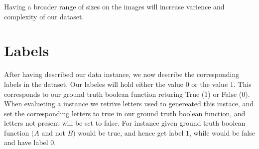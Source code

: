 Having a broader range of sizes on the images will increase varience and complexity of our dataset.

\section{Labels}
After having described our data instance, we now describe the corresponding labels in the dataset.
Our labeles will hold either the value $0$ or the value $1$. This corresponds to our ground truth boolean function returing 
True ($1$) or False ($0$). When evalueting a instance we retrive letters used to genereated this instace,
and set the corresponding letters to true in our ground truth boolean function, and letters not present will be set to false.
For instance given ground truth boolean function $(A $ and not $ B)$  would be true, and hence 
get label $1$, while  would be false and have label $0$.

